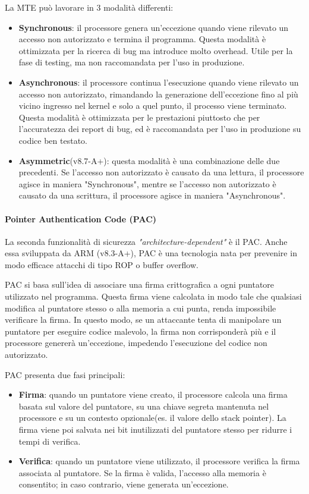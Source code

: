 La MTE può lavorare in 3 modalità differenti:
\begin{itemize}
  \item \textbf{Synchronous}: il processore genera un'eccezione quando viene rilevato
    un accesso non autorizzato e termina il programma. Questa modalità è
    ottimizzata per la ricerca di bug ma introduce molto overhead. Utile per la fase
    di testing, ma non raccomandata per l'uso in produzione.

  \item \textbf{Asynchronous}: il processore continua l'esecuzione quando viene rilevato
    un accesso non autorizzato, rimandando la generazione dell'eccezione fino al
    più vicino ingresso nel kernel e solo a quel punto, il processo viene terminato.
    Questa modalità è ottimizzata per le prestazioni piuttosto che per l'accuratezza
    dei report di bug, ed è raccomandata per l'uso in produzione su codice ben testato.

  \item \textbf{Asymmetric}(v8.7-A+): questa modalità è una combinazione delle
    due precedenti. Se l'accesso non autorizzato è causato da una lettura, il
    processore agisce in maniera "Synchronous", mentre se l'accesso non autorizzato
    è causato da una scrittura, il processore agisce in maniera "Asynchronous".
\end{itemize}

\paragraph{Pointer Authentication Code (PAC)}
La seconda funzionalità di sicurezza \textit{"architecture-dependent"} è il PAC.
Anche essa sviluppata da ARM (v8.3-A+), PAC è una tecnologia nata per prevenire
in modo efficace attacchi di tipo ROP o buffer overflow.

PAC si basa sull'idea di associare una firma crittografica a ogni puntatore
utilizzato nel programma. Questa firma viene calcolata in modo tale che qualsiasi
modifica al puntatore stesso o alla memoria a cui punta, renda impossibile
verificare la firma. In questo modo, se un attaccante tenta di manipolare un
puntatore per eseguire codice malevolo, la firma non corrisponderà più e il processore
genererà un'eccezione, impedendo l'esecuzione del codice non autorizzato.

PAC presenta due fasi principali:
\begin{itemize}
  \item \textbf{Firma}: quando un puntatore viene creato, il processore calcola
    una firma basata sul valore del puntatore, su una chiave segreta mantenuta nel
    processore e su un contesto opzionale(es. il valore dello stack pointer). La
    firma viene poi salvata nei bit inutilizzati del puntatore stesso per
    ridurre i tempi di verifica.

  \item \textbf{Verifica}: quando un puntatore viene utilizzato, il processore
    verifica la firma associata al puntatore. Se la firma è valida, l'accesso
    alla memoria è consentito; in caso contrario, viene generata un'eccezione.
\end{itemize}

